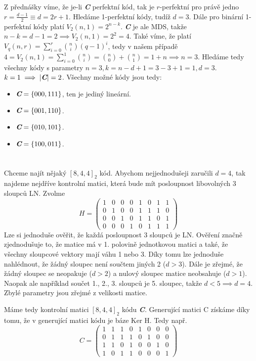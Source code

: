 \documentclass[12pt, a4paper]{article}
\begin{document}
\section{}
Z přednášky víme, že je-li \textit{\textbf{C}} perfektní kód, tak je $r$-perfektní pro právě jedno $r=\frac{d-1}{2} \equiv d=2r+1$. Hledáme 1-perfektní kódy, tudíž $d=3$. Dále pro binární 1-perfektní kódy platí $V_{2}(n,1)=2^{n-k}$. \textit{\textbf{C}} je ale MDS, takže $n-k=d-1=2 \implies V_{2}(n,1)=2^{2}=4$. Také víme, že platí $V_{q}(n,r)=\sum_{i=0}^{r} \binom{n}{i}(q-1)^i$, tedy v našem případě $4=V_{2}(n,1)=\sum_{i=0}^{1} \binom{n}{i}=\binom{n}{0}+\binom{n}{1}=1+n \implies n = 3$. Hledáme tedy všechny kódy s parametry $n=3, k=n-d+1=3-3+1=1, d=3$. $k=1 \implies |\textit{\textbf{C}}|=2$. Všechny možné kódy jsou tedy:
\begin{itemize}
    \item $\textit{\textbf{C}}=\{000,111\}$, ten je jediný lineární.
    \item $\textit{\textbf{C}}=\{001,110\}$.
    \item $\textit{\textbf{C}}=\{010,101\}$.
    \item $\textit{\textbf{C}}=\{100,011\}$.
\end{itemize}


\section{}
Chceme najít nějaký $[8,4,4]_{2}$ kód. Abychom nejjednodušeji zaručili $d=4$, tak najdeme nejdříve kontrolní matici, která bude mít posloupnost libovolných 3 sloupců LN. Zvolme 
\[
H= \begin{pmatrix}
1 & 0 & 0 & 0 & 1 & 0 & 1 & 1 \\ 
0 & 1 & 0 & 0 & 1 & 1 & 1 & 0 \\ 
0 & 0 & 1 & 0 & 1 & 1 & 0 & 1 \\ 
0 & 0 & 0 & 1 & 0 & 1 & 1 & 1 
\end{pmatrix}
\]
Lze si jednoduše ověřit, že každá posloupnost 3 sloupců je LN. Ověření značně zjednodušuje to, že matice má v 1. polovině jednotkovou matici a také, že všechny sloupcové vektory mají váhu 1 nebo 3. Díky tomu lze jednoduše nahlédnout, že žádný sloupec není součtem jiných 2 ($d>3$). Dále je zřejmé, že žádný sloupec se neopakuje ($d>2$) a nulový sloupec matice neobsahuje ($d>1$). Naopak ale například součet 1., 2., 3. sloupců je 5. sloupec, takže $d<5 \implies d=4$. Zbylé parametry jsou zřejmé z velikosti matice. 

Máme tedy kontrolní matici $[8,4,4]_{2}$ kódu \textit{\textbf{C}}. Generující matici C získáme díky tomu, že v generující matici kódu je báze Ker H. Tedy např.
\[
C= \begin{pmatrix}
1 & 1 & 1 & 0 & 1 & 0 & 0 & 0 \\ 
0 & 1 & 1 & 1 & 0 & 1 & 0 & 0 \\ 
1 & 1 & 0 & 1 & 0 & 0 & 1 & 0 \\ 
1 & 0 & 1 & 1 & 0 & 0 & 0 & 1 
\end{pmatrix}
\]
\end{document}
